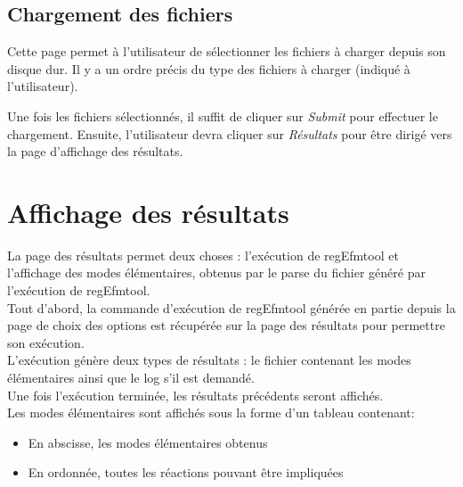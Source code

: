 \subsection{Chargement des fichiers}
Cette page permet à l'utilisateur de sélectionner les fichiers à charger depuis son disque dur. Il y a un ordre précis du type des fichiers à charger (indiqué à l'utilisateur). 


Une fois les fichiers sélectionnés, il suffit de cliquer sur \textit{Submit} pour effectuer le chargement. Ensuite, l'utilisateur devra cliquer sur \textit{Résultats} pour être dirigé vers la page d'affichage des résultats.  

\section{Affichage des résultats}

La page des résultats permet deux choses : l'exécution de regEfmtool et l'affichage des modes élémentaires, obtenus par le parse du fichier généré par l'exécution de regEfmtool.\\

Tout d'abord, la commande d'exécution de regEfmtool générée en partie depuis la page de choix des options est récupérée sur la page des résultats pour permettre son exécution.\\
L'exécution génère deux types de résultats : le fichier contenant les modes élémentaires ainsi que le log s'il est demandé.\\ 

Une fois l'exécution terminée, les résultats précédents seront affichés.\\
Les modes élémentaires sont affichés sous la forme d'un tableau contenant:
\begin{itemize}
\item En abscisse, les modes élémentaires obtenus
\item En ordonnée, toutes les réactions pouvant être impliquées\\
\end{itemize}

